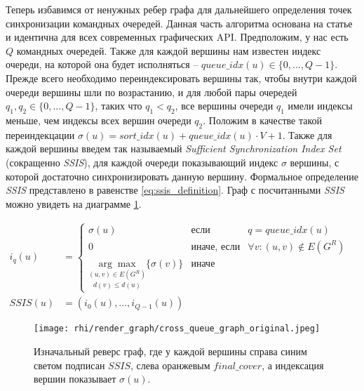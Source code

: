 Теперь избавимся от ненужных ребер графа для дальнейшего определения точек синхронизации командных очередей. Данная часть алгоритма основана на статье \cite{organizing_gpu_work_with_directed_acyclic_graphs} и идентична для всех современных графических API. Предположим, у нас есть $Q$ командных очередей. Также для каждой вершины нам известен индекс очереди, на которой она будет исполняться -- $queue\_idx(u) \in \{0,...,Q-1\}$. Прежде всего необходимо переиндексировать вершины так, чтобы внутри каждой очереди вершины шли по возрастанию, и для любой пары очередей $q_1, q_2 \in \{0,...,Q-1\}$, таких что $q_1 < q_2$, все вершины очереди $q_1$ имели индексы меньше, чем индексы всех вершин очереди $q_2$. Положим в качестве такой переиндекцации $\sigma(u) = sort\_idx(u) + queue\_idx(u) \cdot V + 1$. Также для каждой вершины введем так называемый \textit{Sufficient Synchronization Index Set} (сокращенно \textit{SSIS}), для каждой очереди показывающий индекс $\sigma$ вершины, с которой достаточно синхронизировать данную вершину. Формальное определение \textit{SSIS} представлено в равенстве \ref{eq:ssis_definition}. Граф с посчитанными \textit{SSIS} можно увидеть на диаграмме \ref{fig:cross_queue_graph_original}.

\begin{align}
    i_{q}(u) &= \left\{ \begin{array}{rcl}
        \sigma(u) & \mbox{если} & q = queue\_idx(u) \\
        0 & \mbox{иначе, если} & \forall v: (u, v) \notin E(G^R) \\
        \underset{d(v) \leq d(u)}{\underset{(u,v) \in E(G^R)}{\arg\max}} \{\sigma(v)\} & \mbox{иначе}
    \end{array}\right.&\\
    SSIS(u) &= \left( i_0(u), ..., i_{Q-1}(u) \right) \label{eq:ssis_definition}
\end{align}

\begin{figure}
    \centering
    \texttt{[image: rhi/render\_graph/cross\_queue\_graph\_original.jpeg]}
    \caption{Изначальный реверс граф, где у каждой вершины справа синим светом подписан $SSIS$, слева оранжевым $final\_cover$, а индексация вершин показывает $\sigma(u)$.}
    \label{fig:cross_queue_graph_original}
\end{figure}

